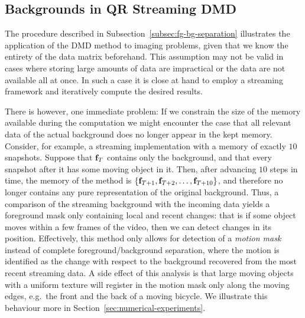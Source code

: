 \subsection{Backgrounds in QR Streaming DMD} %

The procedure described in Subsection~\ref{subsec:fg-bg-separation} illustrates the application of the DMD method to imaging problems, given that we know the entirety of the data matrix beforehand. This assumption may not be valid in cases where storing large amounts of data are impractical or the data are not available all at once. In such a case it is close at hand to employ a streaming framework and iteratively compute the desired results.

There is however, one immediate problem: If we constrain the size of the memory available during the computation we might encounter the case that all relevant data of the actual background does no longer appear in the kept memory. Consider, for example, a streaming implementation with a memory of exactly $10$ snapshots. Suppose that $\mathbf{f}_T$ contains only the background, and that every snapshot after it has some moving object in it. Then, after advancing $10$ steps in time, the memory of the method is $\left\{\mathbf{f}_{T + 1}, \mathbf{f}_{T + 2}, \dots, \mathbf{f}_{T + 10}\right\}$, and therefore no longer contains any pure representation of the original background. Thus, a comparison of the streaming background with the incoming data yields a foreground mask only containing local and recent changes: that is if some object moves within a few frames of the video, then we can detect changes in its position. Effectively, this method only allows for detection of a \emph{motion mask} instead of complete foreground/background separation, where the motion is identified as the change with respect to the background recovered from the most recent streaming data. A side effect of this analysis is that large moving objects with a uniform texture will register in the motion mask only along the moving edges, e.g.\ the front and the back of a moving bicycle. We illustrate this behaviour more in Section~\ref{sec:numerical-experiments}.


